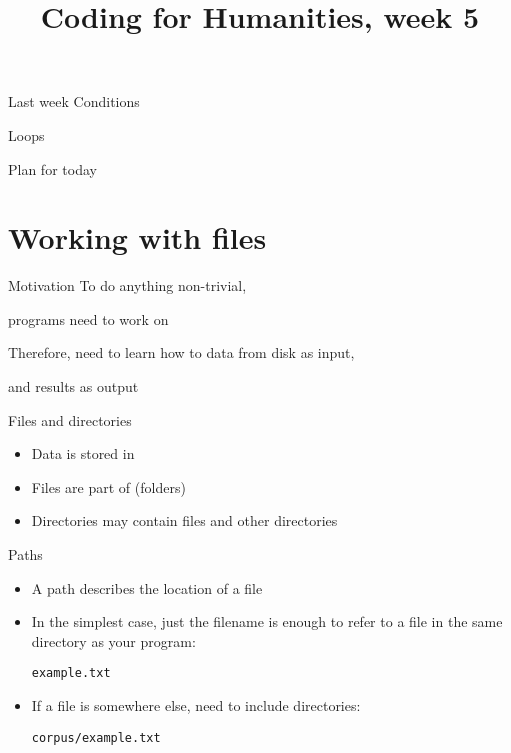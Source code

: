 \documentclass[aspectratio=169,usenames,dvipsnames]{beamer}
\title{Coding for Humanities, week 5}
\begin{document}
\begin{frame}
 \titlepage
\end{frame}

\begin{frame}{Last week}
    Conditions

    Loops
\end{frame}

\begin{frame}{Plan for today}
 \tableofcontents
\end{frame}


\section{Working with files}
\frame{\tableofcontents[currentsection]}

\begin{frame}{Motivation}
    To do anything non-trivial,

    programs need to work on 

    \pause
    Therefore, need to learn how to  data from disk as input,

    and  results as output

\end{frame}


\begin{frame}{Files and directories}
    \begin{itemize}
        \item Data is stored in 
        \item Files are part of  (folders)
        \item Directories may contain files and other directories
    \end{itemize}
\end{frame}

\begin{frame}{Paths}
    \begin{itemize}
        \item A path describes the location of a file
        \item In the simplest case, just the filename is enough to
            refer to a file in the same directory as your program:

            \texttt{example.txt}
        \item If a file is somewhere else, need to include directories:

            \texttt{corpus/example.txt}
    \end{itemize}
\end{frame}
\end{document}
